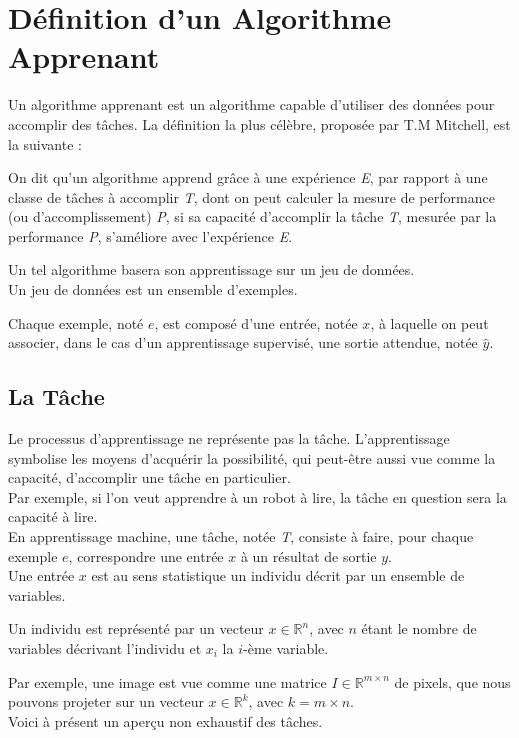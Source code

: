 \documentclass[10pt,a4paper]{report}
\begin{document}
	\section{Définition d'un Algorithme Apprenant}
	Un algorithme apprenant est un algorithme capable d'utiliser des données pour accomplir des tâches. La définition la plus célèbre, proposée par T.M Mitchell, est la suivante : \\
	\begin{displayquote}
	On dit qu'un algorithme apprend grâce à une expérience \emph{E}, par rapport à une classe de tâches à accomplir \emph{T}, dont on peut calculer la mesure de performance (ou d'accomplissement) \emph{P}, si sa capacité d'accomplir la tâche \emph{T}, mesurée par la performance \emph{P}, s'améliore avec l'expérience \emph{E}.
	\end{displayquote}
	Un tel algorithme basera son apprentissage sur un jeu de données.\\
	Un jeu de données est un ensemble d'exemples.\\
	\begin{center}
	Chaque exemple, noté $e$, est composé d'une entrée, notée $x$, à laquelle on peut associer, dans le cas d'un apprentissage supervisé, une sortie attendue, notée $\hat{y}$.
	\end{center}
		\subsection{La Tâche}
		Le processus d'apprentissage ne représente pas la tâche. L'apprentissage symbolise les moyens d'acquérir la possibilité, qui peut-être aussi vue comme la capacité, d'accomplir une tâche en particulier.\\
		Par exemple, si l'on veut apprendre à un robot à lire, la tâche en question sera la capacité à lire.\\
		En apprentissage machine, une tâche, notée \emph{T}, consiste à faire, pour chaque exemple $e$, correspondre une entrée $x$ à un résultat de sortie $y$.\\
		Une entrée $x$ est au sens statistique un individu décrit par un ensemble de variables.
		\begin{center}
		Un individu est représenté par un vecteur $x \in \mathbb{R}^n$, avec $n$ étant le nombre de variables décrivant l'individu et $x_i$ la $i$-ème variable.
		\end{center}
		Par exemple, une image est vue comme une matrice $I \in \mathbb{R}^{m \times n}$ de pixels, que nous pouvons projeter sur un vecteur $x \in \mathbb{R}^k$, avec $k = m \times n$.\\
		Voici à présent un aperçu non exhaustif des tâches.
\end{document}
